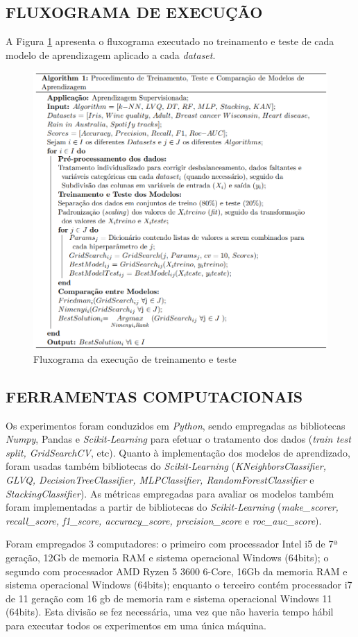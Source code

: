 \documentclass[journal]{IEEEtran}
\begin{document}
\subsection{FLUXOGRAMA DE EXECUÇÃO}

A Figura \ref{fig:3} apresenta o fluxograma executado no treinamento e teste de cada modelo de aprendizagem aplicado a cada \textit{dataset}.

\begin{figure}
	\centering
	\includegraphics[width=0.7 \textwidth]{Figures/Fig3.png}
	\caption{Fluxograma da execução de treinamento e teste}
	\label{fig:3}
\end{figure}

\subsection{FERRAMENTAS COMPUTACIONAIS}

Os experimentos foram conduzidos em \textit{Python}, sendo empregadas as bibliotecas \textit{Numpy}, {Pandas} e \textit{Scikit-Learning} para efetuar o tratamento dos dados (\textit{train test split, GridSearchCV}, etc). Quanto à implementação dos modelos de aprendizado, foram usadas também bibliotecas do \textit{Scikit-Learning} (\textit{KNeighborsClassifier, GLVQ, DecisionTreeClassifier, MLPClassifier, RandomForestClassifier} e \textit{StackingClassifier}). As métricas empregadas para avaliar os modelos também foram implementadas a partir de bibliotecas do \textit{Scikit-Learning} (\textit{make\_scorer, recall\_score, f1\_score, accuracy\_score, precision\_score} e \textit{roc\_auc\_score}).

Foram empregados 3 computadores: o primeiro com processador Intel i5 de 7ª geração, 12Gb de memoria RAM e sistema operacional Windows (64bits); o segundo com processador AMD Ryzen 5 3600 6-Core, 16Gb da memoria RAM e sistema operacional Windows (64bits); enquanto o terceiro contém processador i7 de 11 geração com 16 gb de memoria ram e sistema operacional Windows 11 (64bits). Esta divisão se fez necessária, uma vez que não haveria tempo hábil para executar todos os experimentos em uma única máquina.
\end{document}
